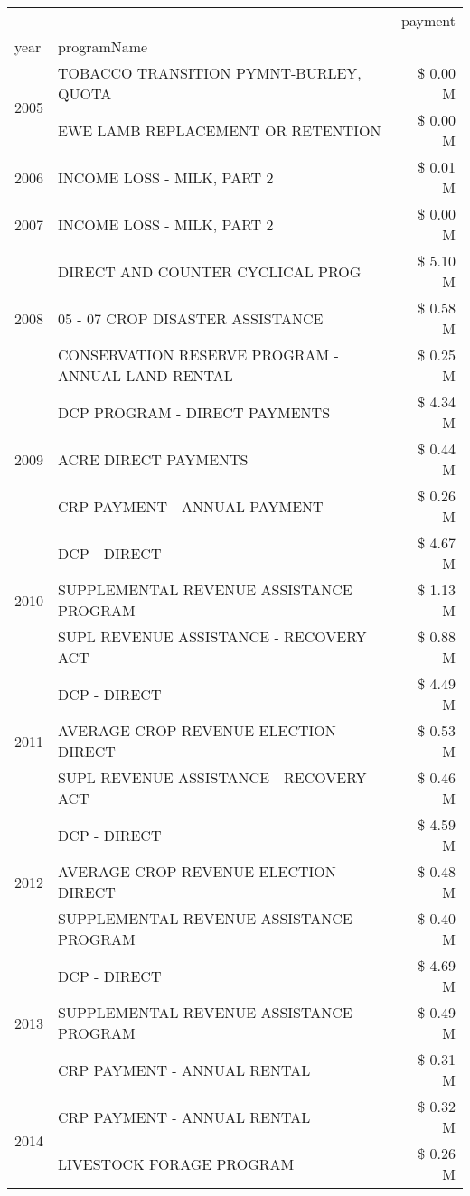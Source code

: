 \begin{tabular}{llr}
\toprule
 &  & payment \\
year & programName &  \\
\midrule
\multirow[t]{2}{*}{2005} & TOBACCO TRANSITION PYMNT-BURLEY, QUOTA & \$ 0.00 M \\
 & EWE LAMB REPLACEMENT OR RETENTION & \$ 0.00 M \\
\cline{1-3}
2006 & INCOME LOSS - MILK, PART 2 & \$ 0.01 M \\
\cline{1-3}
2007 & INCOME LOSS - MILK, PART 2 & \$ 0.00 M \\
\cline{1-3}
\multirow[t]{3}{*}{2008} & DIRECT AND COUNTER CYCLICAL PROG & \$ 5.10 M \\
 & 05 - 07 CROP DISASTER ASSISTANCE & \$ 0.58 M \\
 & CONSERVATION RESERVE PROGRAM - ANNUAL LAND RENTAL & \$ 0.25 M \\
\cline{1-3}
\multirow[t]{3}{*}{2009} & DCP PROGRAM - DIRECT PAYMENTS & \$ 4.34 M \\
 & ACRE DIRECT PAYMENTS & \$ 0.44 M \\
 & CRP PAYMENT - ANNUAL PAYMENT & \$ 0.26 M \\
\cline{1-3}
\multirow[t]{3}{*}{2010} & DCP - DIRECT & \$ 4.67 M \\
 & SUPPLEMENTAL REVENUE ASSISTANCE PROGRAM & \$ 1.13 M \\
 & SUPL REVENUE ASSISTANCE - RECOVERY ACT & \$ 0.88 M \\
\cline{1-3}
\multirow[t]{3}{*}{2011} & DCP - DIRECT & \$ 4.49 M \\
 & AVERAGE CROP REVENUE ELECTION-DIRECT & \$ 0.53 M \\
 & SUPL REVENUE ASSISTANCE - RECOVERY ACT & \$ 0.46 M \\
\cline{1-3}
\multirow[t]{3}{*}{2012} & DCP - DIRECT & \$ 4.59 M \\
 & AVERAGE CROP REVENUE ELECTION-DIRECT & \$ 0.48 M \\
 & SUPPLEMENTAL REVENUE ASSISTANCE PROGRAM & \$ 0.40 M \\
\cline{1-3}
\multirow[t]{3}{*}{2013} & DCP - DIRECT & \$ 4.69 M \\
 & SUPPLEMENTAL REVENUE ASSISTANCE PROGRAM & \$ 0.49 M \\
 & CRP PAYMENT - ANNUAL RENTAL & \$ 0.31 M \\
\cline{1-3}
\multirow[t]{3}{*}{2014} & CRP PAYMENT - ANNUAL RENTAL & \$ 0.32 M \\
 & LIVESTOCK FORAGE PROGRAM & \$ 0.26 M \\

\end{tabular}

